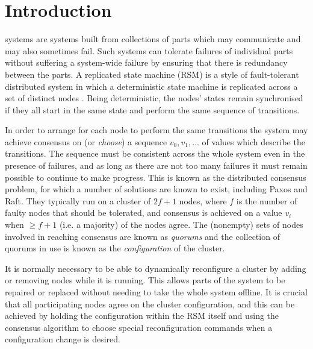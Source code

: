 \documentclass[journal]{IEEEtran}
\begin{document}
%
\IEEEpeerreviewmaketitle

\section{Introduction}

 systems are systems built from collections of
parts which may communicate and may also sometimes fail. Such systems can
tolerate failures of individual parts without suffering a system-wide failure
by ensuring that there is redundancy between the parts.  A replicated state
machine (RSM) is a style of fault-tolerant distributed system in which a
deterministic state machine is replicated across a set of distinct nodes
\cite{lampson}. Being deterministic, the nodes' states remain synchronised if
they all start in the same state and perform the same sequence of transitions.

In order to arrange for each node to perform the same transitions the system
may achieve consensus on (or \textit{choose}) a sequence $v_0, v_1, \ldots$ of
values which describe the transitions. The sequence must be consistent across
the whole system even in the presence of failures, and as long as there are not
too many failures it must remain possible to continue to make progress.  This
is known as the distributed consensus problem, for which a number of solutions
are known to exist, including Paxos \cite{part-time-parliament} and
Raft\cite{raft}. They typically run on a cluster of $2f+1$ nodes, where $f$ is
the number of faulty nodes that should be tolerated, and consensus is achieved
on a value $v_i$ when $\ge f+1$ (i.e. a majority) of the nodes agree.  The
(nonempty) sets of nodes involved in reaching consensus are known as
\textit{quorums} and the collection of quorums in use is known as the
\textit{configuration} of the cluster.

It is normally necessary to be able to dynamically reconfigure a cluster by
adding or removing nodes while it is running. This allows parts of the system
to be repaired or replaced without needing to take the whole system offline. It
is crucial that all participating nodes agree on the cluster configuration, and
this can be achieved by holding the configuration within the RSM itself and
using the consensus algorithm to choose special reconfiguration commands when a
configuration change is desired.
\end{document}

